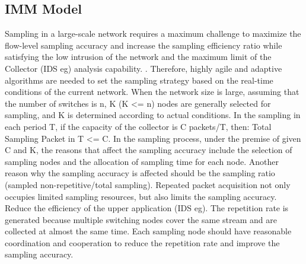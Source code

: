 \documentclass[conference,compsoc]{IEEEtran}
\begin{document}
\subsection{IMM  Model}

Sampling in a large-scale network requires a maximum challenge to maximize the flow-level sampling accuracy and increase the sampling efficiency ratio while satisfying the low intrusion of the network and the maximum limit of the Collector (IDS eg) analysis capability. . Therefore, highly agile and adaptive algorithms are needed to set the sampling strategy based on the real-time conditions of the current network. When the network size is large, assuming that the number of switches is n, K (K <= n) nodes are generally selected for sampling, and K is determined according to actual conditions. In the sampling in each period T, if the capacity of the collector is C packets/T, then: Total Sampling Packet in T <= C. In the sampling process, under the premise of given C and K, the reasons that affect the sampling accuracy include the selection of sampling nodes and the allocation of sampling time for each node. Another reason why the sampling accuracy is affected should be the sampling ratio (sampled non-repetitive/total sampling). Repeated packet acquisition not only occupies limited sampling resources, but also limits the sampling accuracy. Reduce the efficiency of the upper application (IDS eg). The repetition rate is generated because multiple switching nodes cover the same stream and are collected at almost the same time. Each sampling node should have reasonable coordination and cooperation to reduce the repetition rate and improve the sampling accuracy.
\end{document}
